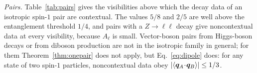 \emph{Pairs.} Table~\ref{tab:pairs} gives the visibilities above which the decay data of an isotropic spin-$1$ pair are contextual. The values $5/8$ and $2/5$ are well above the entanglement threshold $1/4$, and pairs with a $Z\to\ell\ell$ decay give noncontextual data at every visibility, because $A_\ell$ is small. Vector-boson pairs from Higgs-boson decays or from diboson production are not in the isotropic family in general; for them Theorem~\ref{thm:onepair} does not apply, but Eq.~\eqref{eq:dipole} does: for any state of two spin-$1$ particles, noncontextual data obey $|\langle\bm{q}_A\!\cdot\!\bm{q}_B\rangle|\le1/3$.
